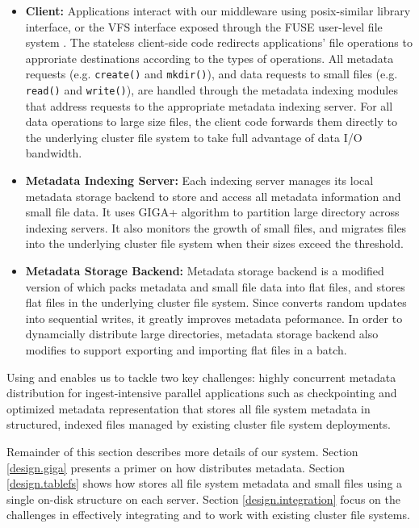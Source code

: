 \begin{itemize}
\item{\textbf{Client:}} Applications interact with our middleware
using posix-similar library interface, or the VFS interface exposed
through the FUSE user-level file system \cite{fuse}.
The stateless client-side code redirects applications' file operations
to approriate destinations according to the types of operations.
All metadata requests (e.g. \texttt{create()} and \texttt{mkdir()}),
and data requests to small files (e.g. \texttt{read()} and \texttt{write()}),
are handled through the metadata indexing modules that address
requests to the appropriate metadata indexing server.
For all data operations to large size files, the client code forwards
them directly to the underlying cluster file system to take full
advantage of data I/O bandwidth.

\item{\textbf{Metadata Indexing Server:}}
Each indexing server manages its local metadata storage backend to store and
access all metadata information and small file data. It uses GIGA+ algorithm to
partition large directory across indexing servers. It also monitors the growth
of small files, and migrates files into the underlying cluster file system
when their sizes exceed the threshold.

\item{\textbf{Metadata Storage Backend:}}
Metadata storage backend is a modified version of \tfs which packs metadata and
small file data into flat files, and stores flat files
in the underlying cluster file system. Since \tfs converts random updates into
sequential writes, it greatly improves metadata peformance. In order to
dynamcially distribute large directories, metadata storage backend also modifies
\tfs to support exporting and importing flat files in a batch.

\end{itemize}


Using \giga{} and \tfs enables us to tackle two key challenges: highly
concurrent metadata distribution for ingest-intensive parallel applications
such as checkpointing \cite{PLFS} and
optimized metadata representation that stores all file system
metadata in structured, indexed files managed by existing cluster file system
deployments.

Remainder of this section describes more details of our system.
Section \ref{design.giga} presents a primer on how \giga{} distributes metadata.
Section \ref{design.tablefs} shows how \tfs stores all file system metadata
and small files using a single on-disk structure on each server.
Section \ref{design.integration} focus on the challenges in effectively
integrating \giga{} and \tfs to work with existing cluster file systems.


